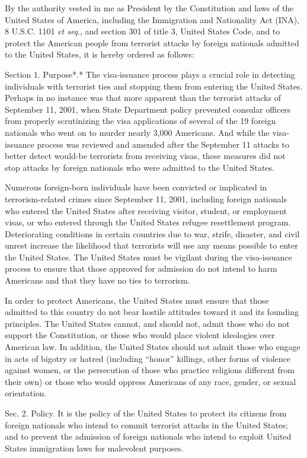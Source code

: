 By the authority vested in me as President by the Constitution and laws
of the United States of America, including the Immigration and
Nationality Act (INA), 8 U.S.C. 1101 \emph{et seq}., and section 301 of
title 3, United States Code, and to protect the American people from
terrorist attacks by foreign nationals admitted to the United States, it
is hereby ordered as follows:

Section 1. Purpose*.* The visa-issuance process plays a crucial role in
detecting individuals with terrorist ties and stopping them from
entering the United States. Perhaps in no instance was that more
apparent than the terrorist attacks of September 11, 2001, when State
Department policy prevented consular officers from properly scrutinizing
the visa applications of several of the 19 foreign nationals who went on
to murder nearly 3,000 Americans. And while the visa-issuance process
was reviewed and amended after the September 11 attacks to better detect
would-be terrorists from receiving visas, these measures did not stop
attacks by foreign nationals who were admitted to the United States.

Numerous foreign-born individuals have been convicted or implicated in
terrorism-related crimes since September 11, 2001, including foreign
nationals who entered the United States after receiving visitor,
student, or employment visas, or who entered through the United States
refugee resettlement program. Deteriorating conditions in certain
countries due to war, strife, disaster, and civil unrest increase the
likelihood that terrorists will use any means possible to enter the
United States. The United States must be vigilant during the
visa-issuance process to ensure that those approved for admission do not
intend to harm Americans and that they have no ties to terrorism.

In order to protect Americans, the United States must ensure that those
admitted to this country do not bear hostile attitudes toward it and its
founding principles. The United States cannot, and should not, admit
those who do not support the Constitution, or those who would place
violent ideologies over American law. In addition, the United States
should not admit those who engage in acts of bigotry or hatred
(including ``honor'' killings, other forms of violence against women, or
the persecution of those who practice religions different from their
own) or those who would oppress Americans of any race, gender, or sexual
orientation.

Sec. 2. Policy. It is the policy of the United States to protect its
citizens from foreign nationals who intend to commit terrorist attacks
in the United States; and to prevent the admission of foreign nationals
who intend to exploit United States immigration laws for malevolent
purposes.

